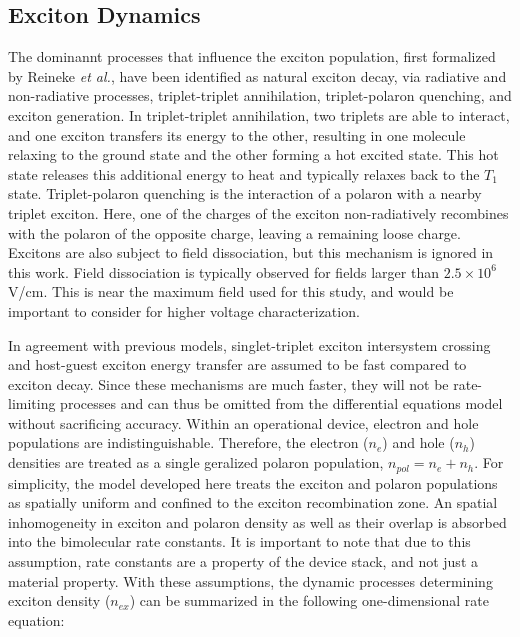 \documentclass[../thesis.tex]{subfiles}
\begin{document}
\subsection{Exciton Dynamics}
The dominannt processes that influence the exciton population, first formalized by Reineke \textit{et al.}\cite{Reineke2007}, have been identified as natural exciton decay, via radiative and non-radiative processes, triplet-triplet annihilation, triplet-polaron quenching, and exciton generation.\cite{Erickson2014,Song2010}
In triplet-triplet annihilation, two triplets are able to interact, and one exciton transfers its energy to the other, resulting in one molecule relaxing to the ground state and the other forming a hot excited state.
This hot state releases this additional energy to heat and typically relaxes back to the $T_1$ state.  
Triplet-polaron quenching is the interaction of a polaron with a nearby triplet exciton.
Here, one of the charges of the exciton non-radiatively recombines with the polaron of the opposite charge, leaving a remaining loose charge.
Excitons are also subject to field dissociation, but this mechanism is ignored in this work.
Field dissociation is typically observed for fields larger than $2.5 \times 10^6$ V/cm.  
This is near the maximum field used for this study, and would be important to consider for higher voltage characterization.

In agreement with previous models, singlet-triplet exciton intersystem crossing and host-guest exciton energy transfer are assumed to be fast compared to exciton decay.\cite{Reineke2007,Baldo2000a,Turro1991a}
Since these mechanisms are much faster, they will not be rate-limiting processes and can thus be omitted from the differential equations model without sacrificing accuracy.
Within an operational device, electron and hole populations are indistinguishable.
Therefore, the electron ($n_e$) and hole ($n_h$) densities are treated as a single geralized polaron population, $n_{pol}=n_e+n_h$.
For simplicity, the model developed here treats the exciton and polaron populations as spatially uniform and confined to the exciton recombination zone.  An spatial inhomogeneity in exciton and polaron density as well as their overlap is absorbed into the bimolecular rate constants.
It is important to note that due to this assumption, rate constants are a property of the device stack, and not just a material property.
With these assumptions, the dynamic processes determining exciton density ($n_{ex}$) can be summarized in the following one-dimensional rate equation:
\end{document}
